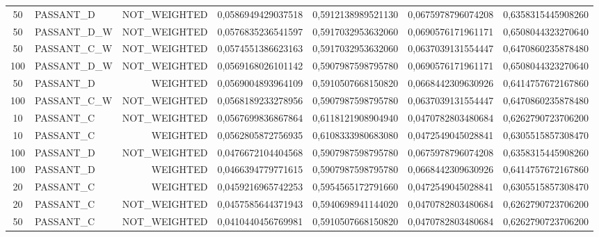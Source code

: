 \begin{table}[H]
{\begin{tabular}{ c l r c c c c }
				50 &  PASSANT\_D & NOT\_WEIGHTED & 0,0586949429037518 & 0,5912138989521130 & 0,0675978796074208 & 0,6358315445908260 \\
				
				50 & PASSANT\_D\_W & NOT\_WEIGHTED & 0,0576835236541597 & 0,5917032953632060 & 0,0690576171961171 & 0,6508044323270640 \\
				
				50 & PASSANT\_C\_W & NOT\_WEIGHTED & 0,0574551386623163 & 0,5917032953632060 & 0,0637039131554447 & 0,6470860235878480 \\
				
				100 & PASSANT\_D\_W & NOT\_WEIGHTED & 0,0569168026101142 & 0,5907987598795780 & 0,0690576171961171 & 0,6508044323270640 \\
				
				50 &  PASSANT\_D &   WEIGHTED & 0,0569004893964109 & 0,5910507668150820 & 0,0668442309630926 & 0,6414757672167860 \\
				
				100 & PASSANT\_C\_W & NOT\_WEIGHTED & 0,0568189233278956 & 0,5907987598795780 & 0,0637039131554447 & 0,6470860235878480 \\
				
				10 &  PASSANT\_C & NOT\_WEIGHTED & 0,0567699836867864 & 0,6118121908904940 & 0,0470782803480684 & 0,6262790723706200 \\
				
				10 &  PASSANT\_C &   WEIGHTED & 0,0562805872756935 & 0,6108333980683080 & 0,0472549045028841 & 0,6305515857308470 \\
				
				100 &  PASSANT\_D & NOT\_WEIGHTED & 0,0476672104404568 & 0,5907987598795780 & 0,0675978796074208 & 0,6358315445908260 \\
				
				100 &  PASSANT\_D &   WEIGHTED & 0,0466394779771615 & 0,5907987598795780 & 0,0668442309630926 & 0,6414757672167860 \\
				
				20 &  PASSANT\_C &   WEIGHTED & 0,0459216965742253 & 0,5954565172791660 & 0,0472549045028841 & 0,6305515857308470 \\
				
				20 &  PASSANT\_C & NOT\_WEIGHTED & 0,0457585644371943 & 0,5940698941144020 & 0,0470782803480684 & 0,6262790723706200 \\
				
				50 &  PASSANT\_C & NOT\_WEIGHTED & 0,0410440456769981 & 0,5910507668150820 & 0,0470782803480684 & 0,6262790723706200 \\
				

\end{tabular}}
\end{table}
